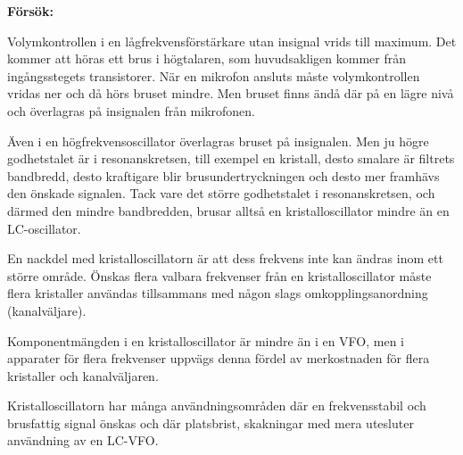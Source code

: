 \textbf{Försök:}

Volymkontrollen i en lågfrekvensförstärkare utan insignal vrids till maximum.
Det kommer att höras ett brus i högtalaren, som huvudsakligen kommer från
ingångsstegets transistorer.
När en mikrofon ansluts måste volymkontrollen vridas ner och då hörs bruset
mindre.
Men bruset finns ändå där på en lägre nivå och överlagras på insignalen från
mikrofonen.

Även i en högfrekvensoscillator överlagras bruset på insignalen.
Men ju högre godhetstalet är i resonanskretsen, till exempel en kristall, desto
smalare är filtrets bandbredd, desto kraftigare blir brusundertryckningen och
desto mer framhävs den önskade signalen.
Tack vare det större godhetstalet i resonanskretsen, och därmed den mindre
bandbredden, brusar alltså en kristalloscillator mindre än en LC-oscillator.

En nackdel med kristalloscillatorn är att dess frekvens inte kan ändras inom 
ett större område.
Önskas flera valbara frekvenser från en kristalloscillator måste flera
kristaller användas tillsammans med någon slags omkopplingsanordning
(kanalväljare).

Komponentmängden i en kristalloscillator är mindre än i en VFO, men i
apparater för flera frekvenser uppvägs denna fördel av merkostnaden
för flera kristaller och kanalväljaren.

Kristalloscillatorn har många användningsområden där en
frekvensstabil och brusfattig signal önskas och där platsbrist,
skakningar med mera utesluter användning av en LC-VFO.
